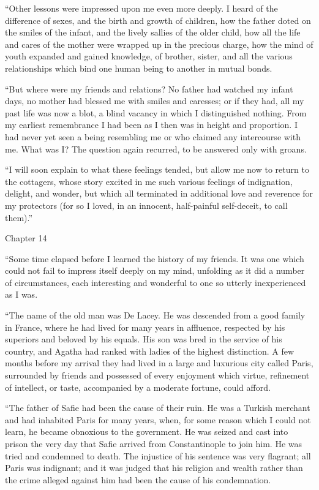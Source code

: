 \documentclass[12pt,openright]{book}
\begin{document}
“Other lessons were impressed upon me even more deeply. I heard of the difference of sexes, and the birth and growth of children, how the father doted on the smiles of the infant, and the lively sallies of the older child, how all the life and cares of the mother were wrapped up in the precious charge, how the mind of youth expanded and gained knowledge, of brother, sister, and all the various relationships which bind one human being to another in mutual bonds.

“But where were my friends and relations? No father had watched my infant days, no mother had blessed me with smiles and caresses; or if they had, all my past life was now a blot, a blind vacancy in which I distinguished nothing. From my earliest remembrance I had been as I then was in height and proportion. I had never yet seen a being resembling me or who claimed any intercourse with me. What was I? The question again recurred, to be answered only with groans.

“I will soon explain to what these feelings tended, but allow me now to return to the cottagers, whose story excited in me such various feelings of indignation, delight, and wonder, but which all terminated in additional love and reverence for my protectors (for so I loved, in an innocent, half-painful self-deceit, to call them).”

Chapter 14

“Some time elapsed before I learned the history of my friends. It was one which could not fail to impress itself deeply on my mind, unfolding as it did a number of circumstances, each interesting and wonderful to one so utterly inexperienced as I was.

“The name of the old man was De Lacey. He was descended from a good family in France, where he had lived for many years in affluence, respected by his superiors and beloved by his equals. His son was bred in the service of his country, and Agatha had ranked with ladies of the highest distinction. A few months before my arrival they had lived in a large and luxurious city called Paris, surrounded by friends and possessed of every enjoyment which virtue, refinement of intellect, or taste, accompanied by a moderate fortune, could afford.

“The father of Safie had been the cause of their ruin. He was a Turkish merchant and had inhabited Paris for many years, when, for some reason which I could not learn, he became obnoxious to the government. He was seized and cast into prison the very day that Safie arrived from Constantinople to join him. He was tried and condemned to death. The injustice of his sentence was very flagrant; all Paris was indignant; and it was judged that his religion and wealth rather than the crime alleged against him had been the cause of his condemnation.
\end{document}

